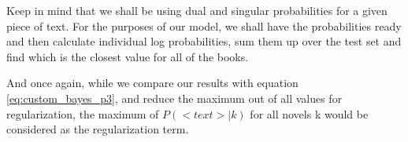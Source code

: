 Keep in mind that we shall be using dual and singular probabilities for a given piece of text. For the purposes of our model, we shall have the probabilities ready and then calculate individual log probabilities, sum them up over the test set and find which is the closest value for all of the books.

And once again, while we compare our results with equation \ref{eq:custom_bayes_p3}, and reduce the maximum out of all values for regularization, the maximum of $P\left( <text> | k\right)$ for all novels k would be considered as the regularization term.
